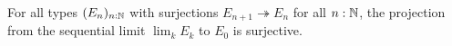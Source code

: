 \begin{axiom}\label{axDependentChoice}
For all types $(E_n)_{n:\mathbb{N}}$ with surjections $E_{n+1}\twoheadrightarrow E_n$ for all $n:\mathbb{N}$, the projection from the sequential limit $\lim_kE_k$ to $E_0$ is surjective.
\end{axiom}
